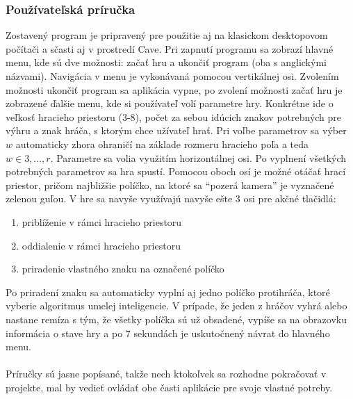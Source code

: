 \subsubsection{Používateľská príručka}
Zostavený program je pripravený pre použitie aj na klasickom desktopovom počítači a sčasti aj v prostredí Cave.
Pri zapnutí programu sa zobrazí hlavné menu, kde sú dve možnosti: začať hru a ukončiť program (oba s anglickými
názvami).
Navigácia v menu je vykonávaná pomocou vertikálnej osi.
Zvolením možnosti ukončiť program sa aplikácia vypne, po zvolení možnosti začať hru je zobrazené ďalšie menu, kde si
používateľ volí parametre hry.
Konkrétne ide o veľkosť hracieho priestoru (3-8), počet za sebou idúcich znakov potrebných pre výhru a znak hráča, s
ktorým chce užívateľ hrať.
Pri voľbe parametrov sa výber $w$ automaticky zhora ohraničí na základe rozmeru hracieho poľa a teda
$w \in {3, \dots, r}$.
Parametre sa volia využitím horizontálnej osi.
Po vyplnení všetkých potrebných parametrov sa hra spustí.
Pomocou oboch osí je možné otáčať hrací priestor, pričom najbližšie políčko, na ktoré sa \enquote{pozerá kamera} je
vyznačené zelenou guľou.
V hre sa navyše využívajú navyše ešte 3 osi pre akčné tlačidlá:
\begin{enumerate}
    \item priblíženie v rámci hracieho priestoru
    \item oddialenie v rámci hracieho priestoru
    \item priradenie vlastného znaku na označené políčko
\end{enumerate}
Po priradení znaku sa automaticky vyplní aj jedno políčko protihráča, ktoré vyberie algoritmus umelej inteligencie.
V prípade, že jeden z hráčov vyhrá alebo nastane remíza s tým, že všetky políčka sú už obsadené, vypíše sa na obrazovku
informácia o stave hry a po 7 sekundách je uskutočnený návrat do hlavného menu.
\\
\\
Príručky sú jasne popísané, takže nech ktokoľvek sa rozhodne pokračovať v projekte, mal by vedieť ovládať obe časti
aplikácie pre svoje vlastné potreby.
